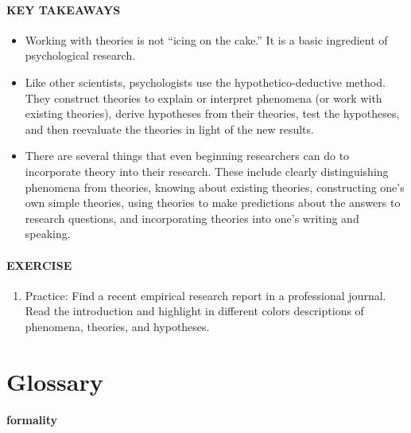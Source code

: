 \documentclass[
]{krantz}
\providecommand{\tightlist}{%
  \setlength{\itemsep}{0pt}\setlength{\parskip}{0pt}}
\begin{document}
\hypertarget{key-takeaways-7}{%
\paragraph*{KEY TAKEAWAYS}\label{key-takeaways-7}}

\begin{itemize}
\tightlist
\item
  Working with theories is not ``icing on the cake.'' It is a basic ingredient of psychological research.
\item
  Like other scientists, psychologists use the hypothetico-deductive method. They construct theories to explain or interpret phenomena (or work with existing theories), derive hypotheses from their theories, test the hypotheses, and then reevaluate the theories in light of the new results.
\item
  There are several things that even beginning researchers can do to incorporate theory into their research. These include clearly distinguishing phenomena from theories, knowing about existing theories, constructing one's own simple theories, using theories to make predictions about the answers to research questions, and incorporating theories into one's writing and speaking.
\end{itemize}

\hypertarget{exercise-1}{%
\paragraph*{EXERCISE}\label{exercise-1}}

\begin{enumerate}
\def\labelenumi{\arabic{enumi}.}
\tightlist
\item
  Practice: Find a recent empirical research report in a professional journal. Read the introduction and highlight in different colors descriptions of phenomena, theories, and hypotheses.
\end{enumerate}

\hypertarget{glossary-2}{%
\section{Glossary}\label{glossary-2}}

\hypertarget{formality-1}{%
\paragraph*{formality}\label{formality-1}}
\end{document}

